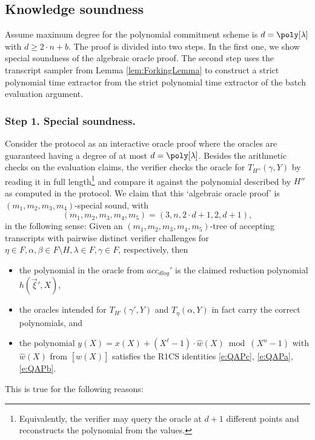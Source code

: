 \documentclass[10pt,article,oneside]{memoir}
\theoremstyle{definition}
\theoremstyle{remark}
\begin{document}
\subsection{Knowledge soundness}

Assume maximum degree for the polynomial commitment scheme is $d=\poly[\lambda]$ with $d\geq 2\cdot n + b$.
The proof is divided into two steps. 
In the first one, we show special soundness of the algebraic oracle proof.
The second step uses the transcript sampler from Lemma \ref{lem:ForkingLemma} to construct a strict polynomial time extractor from the strict polynomial time extractor of the batch evaluation argument. 


\subsubsection{Step 1. Special soundness.} 
Consider the protocol as an interactive oracle proof where the oracles are guaranteed having a degree of at most $d=\poly[\lambda]$.
Besides the arithmetic checks on the evaluation claims, the verifier checks the oracle for $T_{H''}(\gamma,Y)$ by reading it in full length\footnote{%
Equivalently, the verifier may query the oracle at $d+1$ different points and reconstructs the polynomial from the values.
}
and compare it against the polynomial described by $H''$ as computed in the protocol.
We claim that this `algebraic oracle proof' is $(m_1, m_2, m_3, m_4)$-special sound, with
\[
(m_1,m_2,m_3,m_4,m_5)= (3, n, 2\cdot d + 1, 2, d+1),
\]
in the following sense: 
Given an $(m_1,m_2,m_3,m_4,m_5)$-tree of accepting transcripts with pairwise distinct verifier challenges for $\eta\in F,\alpha,\beta\in F\setminus H, \lambda\in F, \gamma\in F$, respectively, then
\begin{itemize}
\item
the polynomial in the oracle from $acc_{dlog}'$ is the claimed reduction polynomial $h(\vec\xi',X)$,
\item 
the oracles intended for $T_{H'}(\gamma',Y)$ and $T_{\eta}(\alpha,Y)$ in fact carry the correct polynomials, and
\item
the polynomial $y(X)= x(X)+(X^\ell -1)\cdot\hat w(X)\bmod (X^n-1)$ with $\hat w(X)$ from $[\hat w(X)]$ satisfies the R1CS identities \eqref{e:QAPc}, \eqref{e:QAPa}, \eqref{e:QAPb}.%
\end{itemize}
This is true for the following reasons:
\end{document}
